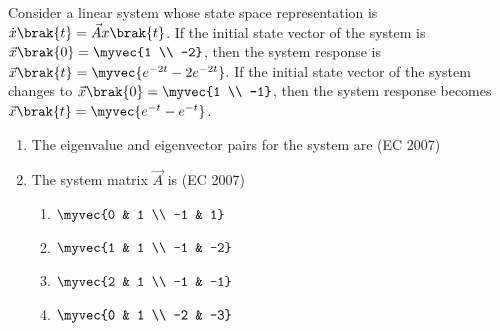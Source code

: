 %
\item  Consider a linear system whose state space representation is $\dot{x}\brak{t} = \vec{A} x\brak{t}$.
If the initial state vector of the system is $\vec{x}\brak{0} = \myvec{1 \\ -2}$, then the system response is 
$\vec{x}\brak{t} = \myvec{e^{-2t}  -2e^{-2t}}.$ 
If the initial state vector of the system changes to $\vec{x}\brak{0} = \myvec{1  \\ -1}$,
then the system response becomes $\vec{x}\brak{t} = \myvec{e^{-t}  -e^{-t}}$. 
\begin{enumerate}
\item The eigenvalue and eigenvector pairs  for the system are
\hfill{{(EC 2007)}}
%
\begin{enumerate}
\end{enumerate}
% 
\item The system matrix $\vec{A}$ is  
\hfill{{(EC 2007)}}
\begin{multicols}{4}
\begin{enumerate}
  \item $\myvec{0 & 1 \\ -1 & 1}$
  \item $\myvec{1 & 1 \\ -1 & -2}$
  \item $\myvec{2 & 1 \\ -1 & -1}$
  \item $\myvec{0 & 1 \\ -2 & -3}$
\end{enumerate}
\end{multicols}
\end{enumerate}

